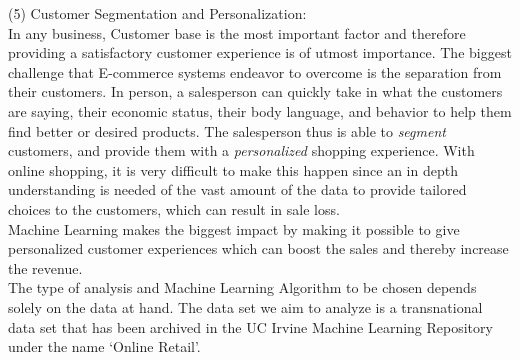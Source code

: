(5) Customer Segmentation and Personalization: \\
In any business, Customer base is the most important factor and therefore providing a satisfactory customer experience is of utmost importance. The biggest challenge that E-commerce systems endeavor to overcome is the separation from their customers. In person, a salesperson can quickly take in what the customers are saying, their economic status, their body language, and behavior to help them find better or desired products. The salesperson thus is able to \emph{segment} customers, and provide them with a \emph{personalized} shopping experience. With online shopping, it is very difficult to make this happen since an in depth understanding is needed of the vast amount of the data to provide tailored choices to the customers, which can result in sale loss. \\
Machine Learning makes the biggest impact by making it possible to give personalized customer experiences which can boost the sales and thereby increase the revenue.\\ 
The type of analysis and Machine Learning Algorithm to be chosen depends solely on the data at hand. The data set we aim to analyze is a transnational data set that has been archived in the UC Irvine Machine Learning Repository under the name `Online Retail'. \\

